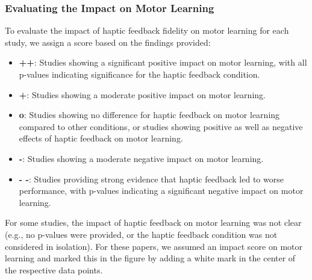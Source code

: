 \subsubsection{Evaluating the Impact on Motor Learning}
\label{sec:impact_motor_learning}

To evaluate the impact of haptic feedback fidelity on motor learning for each study, we assign a score based on the findings provided:

\begin{itemize}
\item \textbf{++}: Studies showing a significant positive impact on motor learning, with all p-values indicating significance for the haptic feedback condition.
\item \textbf{+}: Studies showing a moderate positive impact on motor learning.
\item \textbf{o}: Studies showing no difference for haptic feedback on motor learning compared to other conditions, or studies showing positive as well as negative effects of haptic feedback on motor learning.
\item \textbf{-}: Studies showing a moderate negative impact on motor learning.
\item \textbf{-\hspace{-2mm} -}: Studies providing strong evidence that haptic feedback led to worse performance, with p-values indicating a significant negative impact on motor learning.
\end{itemize}

For some studies, the impact of haptic feedback on motor learning was not clear (e.g., no p-values were provided, or the haptic feedback condition was not considered in isolation). For these papers, we assumed an impact score on motor learning and marked this in the figure by adding a white mark in the center of the respective data points.
